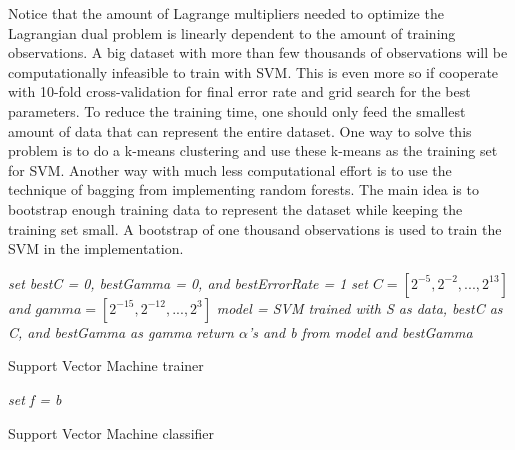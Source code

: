 \documentclass[twoside]{article}
\begin{document}
Notice that the amount of Lagrange multipliers needed to optimize the Lagrangian dual problem is linearly dependent to the amount of training observations. A big dataset with more than few thousands of observations will be computationally infeasible to train with SVM. This is even more so if cooperate with 10-fold cross-validation for final error rate and grid search for the best parameters. To reduce the training time, one should only feed the smallest amount of data that can represent the entire dataset. One way to solve this problem is to do a k-means clustering and use these k-means as the training set for SVM. Another way with much less computational effort is to use the technique of bagging from implementing random forests. The main idea is to bootstrap enough training data to represent the dataset while keeping the training set small. A bootstrap of one thousand observations is used to train the SVM in the implementation.

\IncMargin{1em}
\begin{algorithm}
\BlankLine
{}
\emph{set bestC = 0, bestGamma = 0, and bestErrorRate = 1}\;
\emph{set $C = [2^{-5}, 2^{-2}, ..., 2^{13}]$ and $gamma = [2^{-15}, 2^{-12}, ..., 2^{3}]$}\;
\emph{model = SVM trained with S as data, bestC as C, and bestGamma as gamma}\;
\emph{return $\alpha$'s and b from model and bestGamma}\;
\caption{Support Vector Machine trainer}\label{SVMt}
\end{algorithm}\DecMargin{1em}

\IncMargin{1em}
\begin{algorithm}
\BlankLine
\emph{set f = b}\;
\caption{Support Vector Machine classifier}\label{SVMc}
\end{algorithm}\DecMargin{1em}
\end{document}
